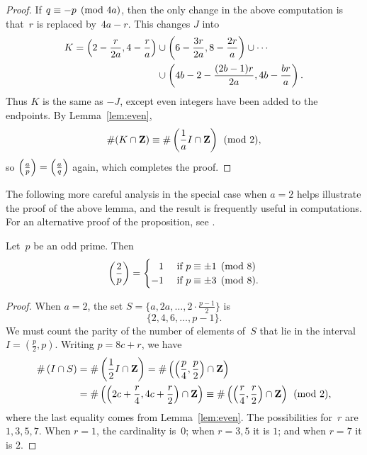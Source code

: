 \begin{proof}
If $q\equiv -p\pmod{4a}$, then the only change in the above computation
is that~$r$ is replaced by~$4a-r$.  This changes $J$ into
\begin{align*}
  K = \left(2-\frac{r}{2a},4-\frac{r}{a}\right) &\cup
  \left(6-\frac{3r}{2a},8-\frac{2r}{a}\right) \cup
  \cdots\\
  &\cup \left(4b-2-\frac{(2b-1)r}{2a},4b-\frac{br}{a}\right).
\end{align*}
Thus $K$ is the same as $-J$, except even integers have
been added to the endpoints.  By Lemma~\ref{lem:even},
$$\#(K\cap \mathbf{Z})\equiv
\#\left(\frac{1}{a}I\cap\mathbf{Z}\right)\pmod{2},$$
so
$\left(\frac{a}{p}\right) = \left(\frac{a}{q}\right)$ again, which completes the proof.
\end{proof}

The following more careful analysis in the special case when $a=2$
helps illustrate the proof of the above lemma, and the result is
frequently useful in computations.  For an alternative proof
of the proposition, see .
\begin{proposition}%
\label{prop:p2}
Let~$p$ be an odd prime.  Then
$$
\kr{2}{p} = \begin{cases} \hfill1 & \text{ if } p\con \pm 1\pmod{8}\\
                         -1 & \text{ if } p\con \pm 3\pmod{8}.  \end{cases}
$$
\end{proposition}
\begin{proof}
When $a=2$, the set $S = \{a,2a,\ldots,2\cdot\frac{p-1}{2}\}$ is
$$
\{ 2, 4, 6, \ldots, p-1 \}.
$$
We must count the parity of the number of elements of~$S$ that lie
in the interval $I=(\frac{p}{2}, p)$.  Writing $p=8c+r$, we have
\begin{align*}
\#\left(I\cap S\right) &=\#\left(\frac{1}{2}I \cap \mathbf{Z}\right)
=\#\left(\left(\frac{p}{4},\frac{p}{2}\right)\cap \mathbf{Z}\right)\\
&=\#\left(\left(2c+\frac{r}{4}, 4c+\frac{r}{2}\right)\cap \mathbf{Z}\right) \equiv \#\left(\left(\frac{r}{4}, \frac{r}{2}\right)\cap \mathbf{Z}\right) \pmod{2},
\end{align*}
where the last equality comes from Lemma~\ref{lem:even}.  The
possibilities for~$r$ are $1,3,5,7$.  When $r=1$, the cardinality
is~$0$; when $r=3, 5$ it is $1$; and when $r=7$ it is $2$.
\end{proof}


